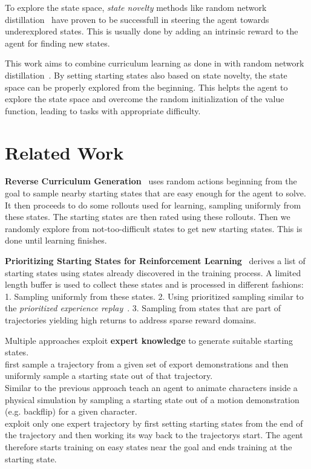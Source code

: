 \documentclass{article}
\begin{document}
To explore the state space, \textit{state novelty} methods like random network distillation~\citep{rnd} have proven to be successfull in steering the agent towards underexplored states. This is usually done by adding an intrinsic reward to the agent for finding new states.

This work aims to combine curriculum learning as done in \cite{prox_curr} with random network distillation~\citep{rnd}. By setting starting states also based on state novelty, the state space can be properly explored from the beginning. This helpts the agent to explore the state space and overcome the random initialization of the value function, leading to tasks with appropriate difficulty.

\section{Related Work}

\textbf{Reverse Curriculum Generation}~\citep{reverse_curr_gen} uses random actions beginning from the goal to sample nearby starting states that are easy enough for the agent to solve. It then proceeds to do some rollouts used for learning, sampling uniformly from these states. The starting states are then rated using these rollouts. Then we randomly explore from not-too-difficult states to get new starting states. This is done until learning finishes.

\textbf{Prioritizing Starting States for Reinforcement Learning}~\citep{prio_start_states} derives a list of starting states using states already discovered in the training process. A limited length buffer is used to collect these states and is processed in different fashions: \\
1. Sampling uniformly from these states. 
2. Using prioritized sampling similar to the \textit{prioritized experience replay}~\citep{prio_exp_replay}. 
3. Sampling from states that are part of trajectories yielding high returns to address sparse reward domains. 

Multiple approaches exploit \textbf{expert knowledge} to generate suitable starting states. \\
\cite{overcoming_exploration} first sample a trajectory from a given set of export demonstrations and then uniformly sample a starting state out of that trajectory. \\
Similar to the previous approach \cite{deepmimic} teach an agent to animate characters inside a physical simulation by sampling a starting state out of a motion demonstration (e.g. backflip) for a given character. \\
\cite{montezuma_demonstration} exploit only one expert trajectory by first setting starting states from the end of the trajectory and then working its way back to the trajectorys start. The agent therefore starts training on easy states near the goal and ends training at the starting state.
\end{document}
